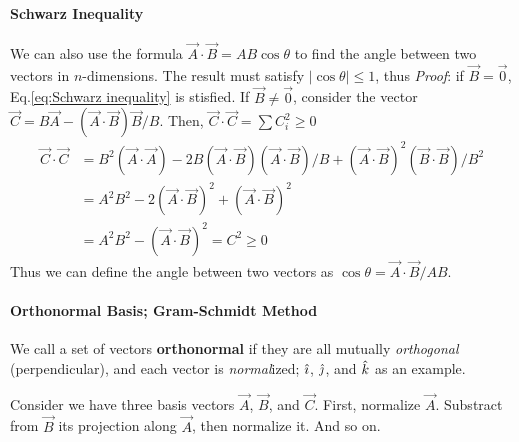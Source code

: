             \paragraph{Schwarz Inequality} %
            \label{par:Schwarz Inequality}
            We can also use the formula $\vec{A} \cdot \vec{B} = AB \cos{\theta}$ to find the angle between two vectors in $n$-dimensions. The result must satisfy
            $|\cos{\theta}| \leq 1$, thus 
            \textit{Proof}: if $\vec{B} = \vec{0}$, Eq.\eqref{eq:Schwarz inequality} is stisfied. If $\vec{B} \neq \vec{0}$, consider the vector 
            $\vec{C} = B\vec{A} - (\vec{A} \cdot \vec{B})\vec{B}/B$. Then, $\vec{C} \cdot \vec{C} = \sum C_i^2 \geq 0 $
            \begin{align*}
                \vec{C} \cdot \vec{C} &= B^2 (\vec{A} \cdot \vec{A}) - 2B(\vec{A} \cdot \vec{B})(\vec{A} \cdot \vec{B})/B + (\vec{A} \cdot \vec{B})^2 
                (\vec{B} \cdot \vec{B})/B^2 \\
                &= A^2 B^2 -2(\vec{A} \cdot \vec{B})^2 + (\vec{A} \cdot \vec{B})^2 \\
                &= A^2 B^2 - (\vec{A} \cdot \vec{B})^2 = C^2 \geq 0
            \end{align*}
            Thus we can define the angle between two vectors as $\cos{\theta} = \vec{A} \cdot \vec{B} / AB$.

            \paragraph{Orthonormal Basis; Gram-Schmidt Method} %
            \label{par:Orthonormal Basis; Gram-Schmidt Method}
            We call a set of vectors \textbf{orthonormal} if they are all mutually \textit{orthogonal} (perpendicular), and each vector is \textit{normal}ized;
            $\hat{\imath}$, $\hat{\jmath}$, and $\hat{k}$ as an example. 
            
            \bulletpar Consider we have three basis vectors $\vec{A}$, $\vec{B}$, and $\vec{C}$. First, normalize $\vec{A}$. Substract 
            from $\vec{B}$ its projection along $\vec{A}$, then normalize it. And so on.

